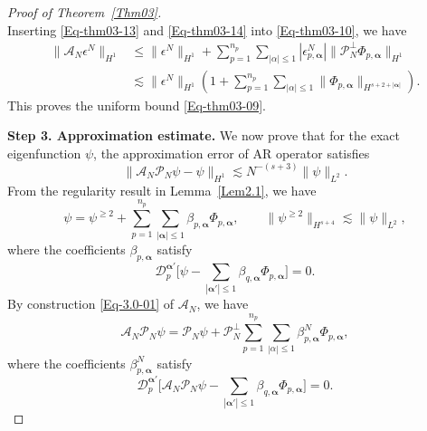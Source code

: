 \documentclass{sn-jnl}%
\numberwithin{equation}{section}
\theoremstyle{thmstyleone}%
\theoremstyle{thmstyletwo}%
\theoremstyle{thmstylethree}%
\begin{document}
\begin{proof}[Proof of Theorem~\ref{Thm03}]
\begin{equation}
    \end{equation}
    Inserting \eqref{Eq-thm03-13} and \eqref{Eq-thm03-14} into \eqref{Eq-thm03-10}, we have 
    \[
    \begin{aligned}
        \bigl\|\mathcal{A}_N\epsilon^N\bigr\|_{H^1} 
        &\leq \bigl\|\epsilon^N\bigr\|_{H^1} + \sum_{p=1}^{n_p}\sum_{|\alpha|\leq  1}|\epsilon^N_{p,\bm \alpha}|\bigl\|\mathcal{P}_N^\perp\Phi_{p,\bm \alpha}\bigr\|_{H^1}\\
        &\lesssim \bigl\|\epsilon^N\bigr\|_{H^1}\left(1 + \sum_{p=1}^{n_p}\sum_{|\alpha|\leq 1} \bigl\|\Phi_{p,\bm \alpha}\bigr\|_{H^{s+2+|\bm \alpha|}}\right).
    \end{aligned}
    \]
    This proves the uniform bound \eqref{Eq-thm03-09}.
    
    \textbf{Step 3. Approximation estimate.} We now prove that for the exact eigenfunction $\psi$, the approximation error of AR operator satisfies 
    \begin{equation}\label{Eq-thm03-15}
        \|\mathcal{A}_N \mathcal{P}_N\psi-\psi\|_{H^{1}}\lesssim N^{-(s+3)}\|\psi\|_{L^2}.
    \end{equation}
    From the regularity result in Lemma~\ref{Lem2.1}, we have 
    \begin{equation}\label{Eq-thm03-16}
    \psi = \psi^{\geq 2}+ \sum_{p=1}^{n_p}\sum_{|\bm \alpha|\leq 1}\beta_{p,\bm \alpha}\Phi_{p,\bm \alpha},    
    \qquad
    \| \psi^{\geq 2}\|_{H^{s+4}} \lesssim \|\psi\|_{L^2},
    \end{equation}
    where the coefficients $\beta_{p,\bm \alpha}$ satisfy
    \begin{equation}\label{Eq-thm03-17}
        \mathcal{D}_p^{\bm \alpha'}\bigl[\psi - \sum_{|\bm \alpha'|\leq 1} \beta_{q,\bm \alpha}\Phi_{p,\bm \alpha}\bigr] = 0.
    \end{equation}
    By construction \eqref{Eq-3.0-01} of $\mathcal{A}_N$, we have
    \begin{equation}\label{Eq-thm03-18}
        \mathcal{A}_N \mathcal{P}_N\psi  = \mathcal{P}_N\psi + \mathcal{P}_N^\perp\sum_{p=1}^{n_p}\sum_{|\alpha|\leq1}\beta^N_{p,\bm \alpha}\Phi_{p,\bm \alpha},
    \end{equation}
    where the coefficients $\beta_{p,\bm \alpha}^N$ satisfy
    \begin{equation}\label{Eq-thm03-19}
        \mathcal{D}_p^{\bm \alpha'}\bigl[\mathcal{A}_N\mathcal{P}_N\psi - \sum_{|\bm \alpha'|\leq 1} \beta_{q,\bm \alpha}\Phi_{p,\bm \alpha}\bigr] = 0.
    \end{equation}

\end{proof}
\end{document}
